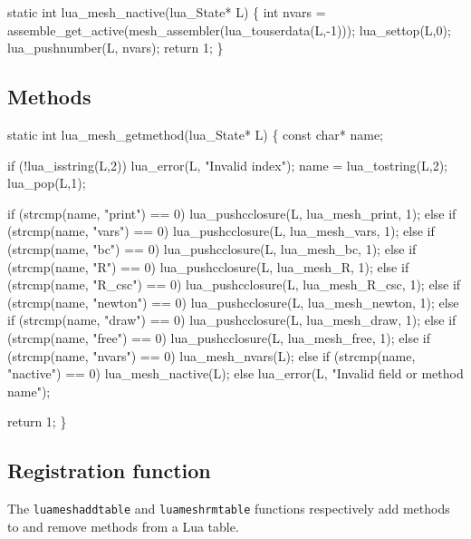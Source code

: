 \nwendcode{}\nwdocspar

\nwenddocs{}\plusendmoddef
static int lua_mesh_nactive(lua_State* L)
\{
    int nvars = assemble_get_active(mesh_assembler(lua_touserdata(L,-1)));
    lua_settop(L,0);
    lua_pushnumber(L, nvars);
    return 1;
\}

\nwendcode{}\nwdocspar


\subsection{Methods}

\nwenddocs{}\plusendmoddef
static int lua_mesh_getmethod(lua_State* L)
\{
    const char* name;

    if (!lua_isstring(L,2))
        lua_error(L, "Invalid index");
    name = lua_tostring(L,2);
    lua_pop(L,1);

    if (strcmp(name, "print") == 0)
        lua_pushcclosure(L, lua_mesh_print, 1);
    else if (strcmp(name, "vars") == 0)
        lua_pushcclosure(L, lua_mesh_vars, 1);
    else if (strcmp(name, "bc") == 0)
        lua_pushcclosure(L, lua_mesh_bc, 1);
    else if (strcmp(name, "R") == 0)
        lua_pushcclosure(L, lua_mesh_R, 1);
    else if (strcmp(name, "R_csc") == 0)
        lua_pushcclosure(L, lua_mesh_R_csc, 1);
    else if (strcmp(name, "newton") == 0)
        lua_pushcclosure(L, lua_mesh_newton, 1);
    else if (strcmp(name, "draw") == 0)
        lua_pushcclosure(L, lua_mesh_draw, 1);
    else if (strcmp(name, "free") == 0)
        lua_pushcclosure(L, lua_mesh_free, 1);
    else if (strcmp(name, "nvars") == 0)
        lua_mesh_nvars(L);
    else if (strcmp(name, "nactive") == 0)
        lua_mesh_nactive(L);
    else
        lua_error(L, "Invalid field or method name");

    return 1;
\}

\nwendcode{}\nwdocspar


\subsection{Registration function}

The {\tt{}lua{}mesh{}add{}table} and {\tt{}lua{}mesh{}rm{}table} functions
respectively add methods to and remove methods from a Lua table.

